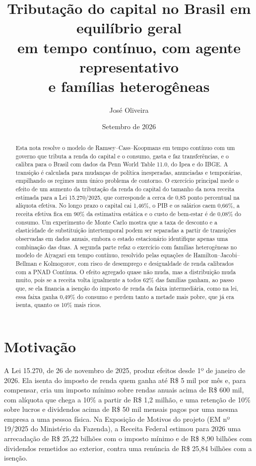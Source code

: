 \documentclass[11pt,a4paper]{article}
\title{Tributação do capital no Brasil em equilíbrio geral\\
em tempo contínuo, com agente representativo\\
e famílias heterogêneas}
\author{José Oliveira}
\date{Setembro de 2026}
\begin{document}
\maketitle

\begin{abstract}
Esta nota resolve o modelo de Ramsey--Cass--Koopmans em tempo contínuo com um
governo que tributa a renda do capital e o consumo, gasta e faz
transferências, e o calibra para o Brasil com dados da Penn World Table 11.0,
do Ipea e do IBGE. A transição é calculada para mudanças de política
inesperadas, anunciadas e temporárias, empilhando os regimes num único
problema de contorno. O exercício principal mede o efeito de um aumento da
tributação da renda do capital do tamanho da nova receita estimada para a
Lei 15.270/2025, que corresponde a cerca de 0,85 ponto percentual na alíquota
efetiva. No longo prazo o capital cai 1,46\%, o PIB e os salários caem
0,66\%, a receita efetiva fica em 90\% da estimativa estática e o custo de
bem-estar é de 0,08\% do consumo. Um experimento de Monte Carlo mostra que a
taxa de desconto e a elasticidade de substituição intertemporal podem ser
separadas a partir de transições observadas em dados anuais, embora o estado
estacionário identifique apenas uma combinação das duas. A segunda parte
refaz o exercício com famílias heterogêneas no modelo de Aiyagari em tempo
contínuo, resolvido pelas equações de Hamilton--Jacobi--Bellman e Kolmogorov,
com risco de desemprego e desigualdade de renda calibrados com a PNAD
Contínua. O efeito agregado quase não muda, mas a distribuição muda muito,
pois se a receita volta igualmente a todos 62\% das famílias ganham, ao passo
que, se ela financia a isenção do imposto de renda da faixa intermediária,
como na lei, essa faixa ganha 0,49\% do consumo e perdem tanto a metade mais
pobre, que já era isenta, quanto os 10\% mais ricos.
\end{abstract}

\section{Motivação}

A Lei 15.270, de 26 de novembro de 2025, produz efeitos desde 1º de janeiro
de 2026. Ela isenta do imposto de renda quem ganha até R\$ 5 mil por mês e,
para compensar, cria um imposto mínimo sobre rendas anuais acima de
R\$ 600 mil, com alíquota que chega a 10\% a partir de R\$ 1,2 milhão, e uma
retenção de 10\% sobre lucros e dividendos acima de R\$ 50 mil mensais pagos
por uma mesma empresa a uma pessoa física. Na Exposição de Motivos do projeto
(EM nº 19/2025 do Ministério da Fazenda), a Receita Federal estimou para 2026
uma arrecadação de R\$ 25,22 bilhões com o imposto mínimo e de R\$ 8,90 bilhões
com dividendos remetidos ao exterior, contra uma renúncia de R\$ 25,84 bilhões
com a isenção.
\end{document}
